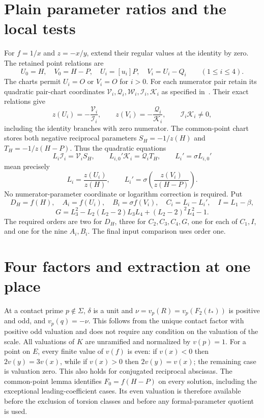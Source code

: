 \documentclass[11pt,a4paper]{article}
\begin{document}
\section{Plain parameter ratios and the local tests}
For $f=1/x$ and $z=-x/y$, extend their regular values at the
identity by zero. The retained point relations are
\[
 U_0=H,\quad V_0=H-P,\quad U_i=[u_i]P,\quad V_i=U_i-Q_i
 \qquad(1\le i\le4).
\]
The charts permit $U_i=O$ or $V_i=O$ for $i>0$.
For each numerator pair retain its quadratic pair-chart coordinates
$\mathcal V_i,\mathcal Q_i,\mathcal W_i,\mathcal I_i,\mathcal K_i$
as specified in~\cite{Even}. Their exact relations give
\[
 z(U_i)=-\frac{\mathcal V_i}{\mathcal I_i},\qquad
 z(V_i)=-\frac{\mathcal Q_i}{\mathcal K_i},\qquad
 \mathcal I_i\mathcal K_i\ne0,
\]
including the identity branches with zero numerator.
The common-point chart stores both negative reciprocal parameters
$S_H=-1/z(H)$ and $T_H=-1/z(H-P)$. Thus the quadratic equations
\[
 L_i\mathcal I_i=\mathcal V_iS_H,\qquad
 L_{i,0}'\mathcal K_i=\mathcal Q_iT_H,\qquad
 L_i'=\sigma L_{i,0}'
\]
mean precisely
\[
 L_i=\frac{z(U_i)}{z(H)},\qquad
 L_i'=\sigma\!\left(\frac{z(V_i)}{z(H-P)}\right).
\]
No numerator-parameter coordinate or logarithm correction is required.
Put
\[
 D_H=f(H),\quad A_i=f(U_i),\quad B_i=\sigma f(V_i),\quad
 C_i=L_i-L_i',\quad I=L_1-\beta,
\]
\[
 G=L_3^2-L_2(L_2-2)L_3L_4+(L_2-2)^2L_4^2-1.
\]
The required orders are two for $D_H$, three for $C_2,C_3,C_4,G$,
one for each of $C_1,I$, and one for the nine $A_i,B_i$.
The final input comparison uses order one.

\section{Four factors and extraction at one place}
At a contact prime $p\notin\Sigma$, $\delta$ is a unit and
$\nu=v_p(R)=v_p(F_2(t_*))$ is positive and odd, and $v_p(q)=-\nu$. This follows
from the unique contact factor with positive odd valuation and
does not require any condition on the valuation of the scale. All valuations
of $K$ are unramified and normalized by $v(p)=1$.
For a point on $E$, every finite value of $v(f)$ is even: if
$v(x)<0$ then $2v(y)=3v(x)$, while if $v(x)>0$ then
$2v(y)=v(x)$; the remaining case is valuation zero.
This also holds for conjugated reciprocal abscissas. The common-point lemma identifies $F_0=f(H-P)$ on every solution,
including the exceptional leading-coefficient cases. Its even valuation
is therefore available before the exclusion of torsion classes and
before any formal-parameter quotient is used.
\end{document}
